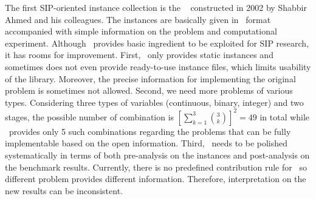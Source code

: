 The first SIP-oriented instance collection is the \siplib\ \cite{web:SIPLIB1} constructed in 2002 by Shabbir Ahmed and his colleagues. The instances are basically given in \smps\ format accompanied with simple information on the problem and computational experiment. Although \siplib\ provides basic ingredient to be exploited for SIP research, it has rooms for improvement. First, \siplib\ only provides static instances and sometimes does not even provide ready-to-use instance files, which limits usability of the library. Moreover, the precise information for implementing the original problem is sometimes not allowed. Second, we need more problems of various types. Considering three types of variables (continuous, binary, integer) and two stages, the possible number of combination is $\left[\sum_{k=1}^3\binom{3}{k}\right]^2=49$ in total while \siplib\ provides only 5 such combinations regarding the problems that can be fully implementable based on the open information.
Third, \siplib\ needs to be polished systematically in terms of both pre-analysis on the instances and post-analysis on the benchmark results. Currently, there is no predefined contribution rule for \siplib\ so different problem provides different information. Therefore, interpretation on the new results can be inconsistent.




